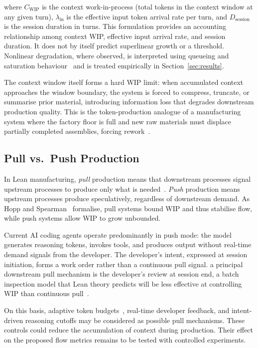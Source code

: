 \documentclass[journal]{IEEEtran}
\begin{document}
\noindent where $C_{\text{WIP}}$ is the context work-in-process (total tokens in the context window at any given turn), $\lambda_{\text{in}}$ is the effective input token arrival rate per turn, and $D_{\text{session}}$ is the session duration in turns. This formulation provides an accounting relationship among context WIP, effective input arrival rate, and session duration. It does not by itself predict superlinear growth or a threshold. Nonlinear degradation, where observed, is interpreted using queueing and saturation behaviour~\cite{kleinrock1975} and is treated empirically in Section~\ref{sec:results}.

The context window itself forms a hard WIP limit: when accumulated context approaches the window boundary, the system is forced to compress, truncate, or summarise prior material, introducing information loss that degrades downstream production quality. This is the token-production analogue of a manufacturing system where the factory floor is full and new raw materials must displace partially completed assemblies, forcing rework~\cite{goldratt1984}.

\subsection{Pull vs.\ Push Production}

In Lean manufacturing, \emph{pull} production means that downstream processes signal upstream processes to produce only what is needed~\cite{ohno1988}. \emph{Push} production means upstream processes produce speculatively, regardless of downstream demand. As Hopp and Spearman~\cite{hopp2004} formalise, pull systems bound WIP and thus stabilise flow, while push systems allow WIP to grow unbounded.

Current AI coding agents operate predominantly in push mode: the model generates reasoning tokens, invokes tools, and produces output without real-time demand signals from the developer. The developer's intent, expressed at session initiation, forms a work order rather than a continuous pull signal. a principal downstream pull mechanism is the developer's review at session end, a batch inspection model that Lean theory predicts will be less effective at controlling WIP than continuous pull~\cite{anderson2010}.

On this basis, adaptive token budgets~\cite{selfbudgeter2025, tale2024}, real-time developer feedback, and intent-driven reasoning cutoffs may be considered as possible pull mechanisms. These controls could reduce the accumulation of context during production. Their effect on the proposed flow metrics remains to be tested with controlled experiments.
\end{document}
